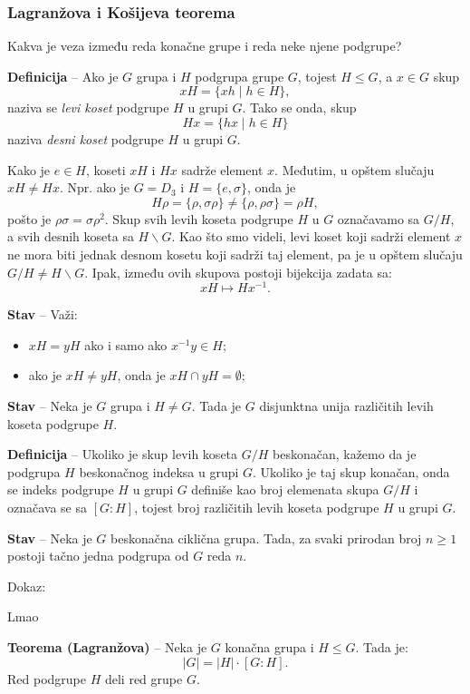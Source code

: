 \documentclass[a4paper,12pt]{article}
\newcommand{\f}[1]{\(#1\)}
\begin{document}
\subsubsection{Lagranžova i Košijeva teorema}
Kakva je veza između reda konačne grupe i reda neke njene podgrupe?

\textbf{Definicija} -- Ako je \f{G} grupa i \f{H} podgrupa grupe \f{G}, tojest \f{H \leq G}, a \f{x \in G} skup
\[
xH = \{ xh \mid h \in H \},
\]
naziva se \emph{levi koset} podgrupe \f{H} u grupi \f{G}. Tako se onda, skup 
\[
Hx = \{ hx \mid h \in H \}
\]
naziva \emph{desni koset} podgrupe \f{H} u grupi \f{G}.

Kako je $e \in H$, koseti $xH$ i $Hx$ sadrže element $x$. Međutim, u opštem
slučaju $xH \neq Hx$. Npr. ako je $G = D_3$ i $H = \{e,\sigma\}$, onda je
\[
H\rho = \{\rho,\sigma\rho\} \neq \{\rho,\rho\sigma\} = \rho H,
\]
pošto je $\rho\sigma = \sigma\rho^2$.
Skup svih levih koseta podgrupe $H$ u $G$ označavamo sa $G/H$, a svih desnih
koseta sa $H\backslash G$. Kao što smo videli, levi koset koji sadrži
element $x$ ne mora biti jednak desnom kosetu koji sadrži taj element,
pa je u opštem slučaju $G/H \neq H\backslash G$. Ipak, između ovih skupova
postoji bijekcija zadata sa:
\[
xH \mapsto Hx^{-1}.
\]


\textbf{Stav} -- Važi:
\begin{itemize}
  \item \f{xH = yH} ako i samo ako \f{x^{-1}y \in H};
  \item ako je \f{xH \neq yH}, onda je \f{xH \cap yH = \emptyset};
\end{itemize}

\textbf{Stav} -- Neka je \f{G} grupa i \f{H \neq G}. Tada je \f{G} disjunktna unija različitih levih koseta podgrupe \f{H}.

\textbf{Definicija} -- Ukoliko je skup levih koseta \f{G/H} beskonačan, kažemo da je podgrupa \f{H} beskonačnog 
indeksa u grupi \f{G}. Ukoliko je taj skup konačan, onda se indeks podgrupe \f{H} u grupi \f{G} definiše kao broj 
elemenata skupa \f{G/H} i označava se sa \f{[G : H]}, tojest broj različitih levih koseta podgrupe \f{H} 
u grupi \f{G}.

\textbf{Stav} -- Neka je \f{G} beskonačna ciklična grupa. Tada, za svaki prirodan broj \f{n \geq 1} postoji tačno jedna podgrupa od \f{G} reda \f{n}.

Dokaz:

Lmao

\bigskip
\textbf{Teorema (Lagranžova)} -- Neka je \f{G} konačna grupa i \f{H \leq G}. Tada je:
\[
|G| = |H| \cdot [G : H].
\]
Red podgrupe \f{H} deli red grupe \f{G}.
\end{document}
